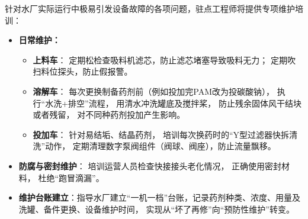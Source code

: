 针对水厂实际运行中极易引发设备故障的各项问题，驻点工程师将提供专项维护培训：
\begin{itemize}
    \item \textbf{日常维护：}
    \begin{itemize}
        \item \textbf{上料车}：
            定期松检查吸料机滤芯，防止滤芯堵塞导致吸料无力；
            定期吹扫料位探头，防止假报警。
        \item \textbf{溶解车}：
            每次更换制备药剂前（例如投加完PAM改为投碳酸钠），
            执行“水洗+排空”流程，
            用清水冲洗罐底及搅拌桨，
            防止残余固体风干结块或者残留，
            对不同种药剂投加产生影响。
        \item \textbf{投加车}：
            针对易结垢、结晶药剂，
            培训每次换药时的“Y型过滤器快拆清洗”动作，
            定期清理数字泵阀组件（阀球、阀座），防止流量飘移。
    \end{itemize}
    \item \textbf{防腐与密封维护}：
        培训运营人员检查快接接头老化情况，
        正确使用密封材料，
        杜绝“跑冒滴漏”。
    \item \textbf{维护台账建立}：指导水厂建立“一机一档”台账，记录药剂种类、浓度、用量及洗罐、备件更换、设备维护时间，
        实现从“坏了再修”向“预防性维护”转变。
\end{itemize}

